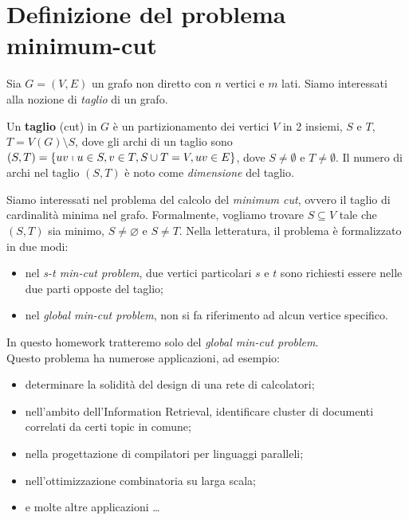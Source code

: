 \section{Definizione del problema minimum-cut}
\label{cap:problem-definition}

Sia $ G = (V,E) $ un grafo non diretto con $ n $ vertici e $ m $ lati. Siamo interessati alla nozione di \textit{taglio} di un grafo.

\begin{defn}
Un \textbf{taglio} (cut) in $ G $ è un partizionamento dei vertici $ V $ in 2 insiemi, $ S $ e $ T $, $ T=V(G) \setminus S$, dove gli archi di un taglio sono $(S, T) = \{ uv \shortmid u \in S, v \in T, S \cup T = V, uv \in E \}$,
dove $ S \neq \emptyset $ e $ T \neq \emptyset $. Il numero di archi nel taglio $ (S,T) $ è noto come \textit{dimensione} del taglio.
\end{defn}

\noindent Siamo interessati nel problema del calcolo del \textit{minimum cut}, ovvero il taglio di cardinalità minima nel grafo.
Formalmente, vogliamo trovare $ S\subseteq V $ tale che $ (S, T) $ sia minimo, $ S \neq \varnothing $ e $ S \neq T $.
Nella letteratura, il problema è formalizzato in due modi:

\begin{itemize}
    \item nel \textit{s-t min-cut problem}, due vertici particolari $s$ e $t$ sono richiesti essere nelle due parti opposte del taglio;
    \item nel \textit{global min-cut problem}, non si fa riferimento ad alcun vertice specifico.
\end{itemize}

\noindent In questo homework tratteremo solo del \textit{global min-cut problem}. \\
\noindent Questo problema ha numerose applicazioni, ad esempio:

\begin{itemize}
    \item determinare la solidità del design di una rete di calcolatori;
    \item nell'ambito dell'Information Retrieval, identificare cluster di documenti correlati da certi topic in comune;
    \item nella progettazione di compilatori per linguaggi paralleli;
    \item nell'ottimizzazione combinatoria su larga scala;
    \item e molte altre applicazioni \ldots
\end{itemize}
